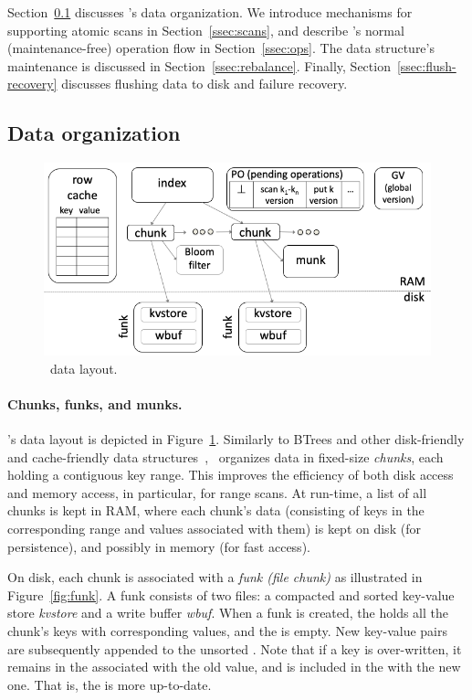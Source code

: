 
Section~\ref{ssec:layout}  discusses \sys's data organization. 
We introduce mechanisms for supporting 
atomic scans  in Section~\ref{ssec:scans}, and describe \sys's
 normal (maintenance-free) operation flow  in Section~\ref{ssec:ops}.  
The data structure's maintenance is discussed in Section~\ref{ssec:rebalance}.
Finally, Section~\ref{ssec:flush-recovery} discusses flushing data to disk and failure recovery.


\subsection{Data organization}
\label{ssec:layout}

\begin{figure}[htb]
\centerline{
\includegraphics[width=\columnwidth]{PiWi.png}
}
\caption{\sys\ data layout.}
\label{fig:layout}
\end{figure}

\paragraph{Chunks, funks, and munks.}

\sys's data layout is depicted in Figure~\ref{fig:layout}.
Similarly to BTrees and other disk-friendly and cache-friendly data structures~\cite{kiwi}, 
\sys\ organizes data in fixed-size \emph{chunks}, each holding a contiguous key range.
This improves the efficiency of both disk access and memory access, in particular, for  range scans. 
At run-time, a list of all chunks is kept in RAM, where each chunk's data 
(consisting of keys in the corresponding range and values associated with them) 
is kept on disk (for persistence), and possibly in memory (for fast access). 

On disk, each chunk is associated with a  \emph{funk (file chunk)} as illustrated in 
Figure~\ref{fig:funk}. A funk
consists of two files:   
a compacted and sorted  key-value store \emph{kvstore} and a write buffer \emph{wbuf}. When a funk is created, the  holds all the chunk's keys with corresponding values, and the   is empty.
New key-value pairs are subsequently appended to the unsorted . Note that if a key is over-written, it remains in the  associated with the old value, and is included in the  with the new one.
That is, the  is more up-to-date.

